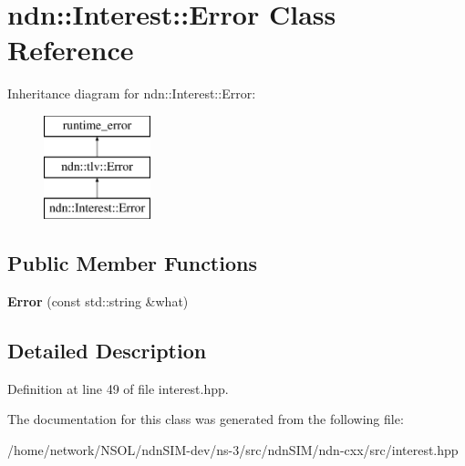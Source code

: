 \hypertarget{classndn_1_1Interest_1_1Error}{}\section{ndn\+:\+:Interest\+:\+:Error Class Reference}
\label{classndn_1_1Interest_1_1Error}
Inheritance diagram for ndn\+:\+:Interest\+:\+:Error\+:\begin{figure}[H]
\begin{center}
\leavevmode
\includegraphics[height=3.000000cm]{classndn_1_1Interest_1_1Error}
\end{center}
\end{figure}
\subsection*{Public Member Functions}
\begin{DoxyCompactItemize}
\item 
{\bfseries Error} (const std\+::string \&what)\hypertarget{classndn_1_1Interest_1_1Error_ae33a6220bfe5fcc3df857b071f0c3a4c}{}\label{classndn_1_1Interest_1_1Error_ae33a6220bfe5fcc3df857b071f0c3a4c}

\end{DoxyCompactItemize}


\subsection{Detailed Description}


Definition at line 49 of file interest.\+hpp.



The documentation for this class was generated from the following file\+:\begin{DoxyCompactItemize}
\item 
/home/network/\+N\+S\+O\+L/ndn\+S\+I\+M-\/dev/ns-\/3/src/ndn\+S\+I\+M/ndn-\/cxx/src/interest.\+hpp\end{DoxyCompactItemize}
